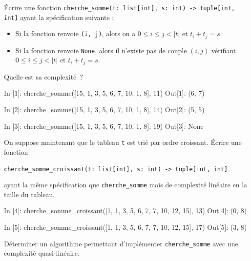 \documentclass{magnoliaold}
\begin{document}
\begin{questions}
  \question Écrire une fonction
  \verb!cherche_somme(t: list[int], s: int) -> tuple[int, int]! ayant
  la spécification suivante :
  \begin{itemize}
    \item Si la fonction renvoie \verb!(i, j)!, alors on a
    $0 \leq i \leq j < |t|$ et $t_i + t_j = s$.
    \item Si la fonction renvoie \verb!None!, alors il n'existe pas de
    couple $(i, j)$ vérifiant $0 \leq i \leq j < |t|$ et
    $t_i + t_j = s$.
  \end{itemize}
  Quelle est sa complexité~?
\begin{pythoncode}
In [1]: cherche_somme([15, 1, 3, 5, 6, 7, 10, 1, 8], 11)
Out[1]: (6, 7)

In [2]: cherche_somme([15, 1, 3, 5, 6, 7, 10, 1, 8], 14)
Out[2]: (5, 5)

In [3]: cherche_somme([15, 1, 3, 5, 6, 7, 10, 1, 8], 19)
Out[3]: None
\end{pythoncode}
  \question On suppose maintenant que le tableau \verb!t! est trié par ordre
  croissant. Écrire une fonction
  \begin{center}\verb!cherche_somme_croissant(t: list[int], s: int) -> tuple[int, int]!\end{center} ayant la
  même spécification que \verb!cherche_somme! mais de complexité linéaire en
  la taille du tableau.
\begin{pythoncode}
In [4]: cherche_somme_croissant([1, 1, 3, 5, 6, 7, 7, 10, 12, 15], 13)
Out[4]: (0, 8)

In [5]: cherche_somme_croissant([1, 1, 3, 5, 6, 7, 7, 10, 12, 15], 17)
Out[5]: (3, 8)
\end{pythoncode}
\question Déterminer un algorithme permettant d'implémenter \verb!cherche_somme! avec
une complexité quasi-linéaire.
\end{questions}
\end{document}
